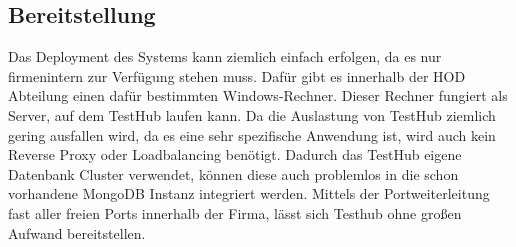\subsection{Bereitstellung}
Das Deployment des Systems kann ziemlich einfach erfolgen, da es nur firmenintern
zur Verfügung stehen muss. Dafür gibt es innerhalb der \gls{HOD} Abteilung einen
dafür bestimmten Windows-Rechner. Dieser Rechner fungiert als Server, auf dem TestHub
laufen kann. Da die Auslastung von TestHub ziemlich gering ausfallen wird, da es 
eine sehr spezifische Anwendung ist, wird auch kein Reverse Proxy oder Loadbalancing
benötigt. Dadurch das TestHub eigene Datenbank Cluster verwendet, können diese auch problemlos in 
die schon vorhandene MongoDB Instanz integriert werden. Mittels der Portweiterleitung
fast aller freien Ports innerhalb der Firma, lässt sich Testhub
ohne großen Aufwand bereitstellen.

\newpage